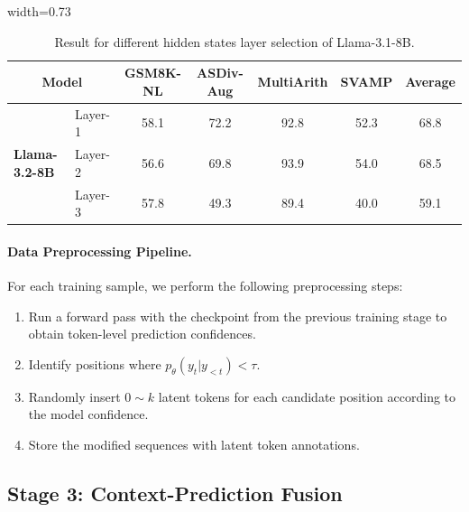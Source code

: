 \documentclass{article}
\theoremstyle{plain}
\theoremstyle{definition}
\theoremstyle{remark}
\begin{document}
\begin{table}[h]
\centering
\begin{adjustbox}{width=0.73 \textwidth}
\begin{tabular}{llccccc}
\toprule
\multicolumn{2}{c}{\bf Model} & \bf GSM8K-NL & \bf ASDiv-Aug & \bf MultiArith & \bf SVAMP & \bf Average \\ 
\midrule

\multirow{3}{*}{\bf Llama-3.2-8B}
& Layer-1            & 58.1 & 72.2 & 92.8 & 52.3 & 68.8 \\
& Layer-2            & 56.6 & 69.8 & 93.9 & 54.0 & 68.5 \\
& Layer-3            & 57.8 & 49.3 & 89.4 & 40.0 & 59.1 \\
\bottomrule
\end{tabular}
\end{adjustbox}
\caption{Result for different hidden states layer selection of Llama-3.1-8B.}
\label{tab:layer_8b}
\end{table}
\paragraph{Data Preprocessing Pipeline.}
For each training sample, we perform the following preprocessing steps:
\begin{enumerate}
    \item Run a forward pass with the checkpoint from the previous training stage to obtain token-level prediction confidences.
    \item Identify positions where $p_\theta(y_t|y_{<t}) < \tau$.
    \item Randomly insert $0\sim k$ latent tokens for each candidate position according to the model confidence.
    \item Store the modified sequences with latent token annotations.
\end{enumerate}


\subsection{Stage 3: Context-Prediction Fusion}
\end{document}
